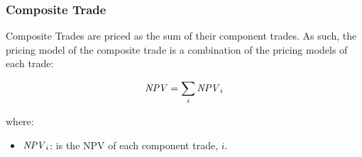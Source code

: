 \subsubsection{Composite Trade}
\label{pricing:composite_trade}

Composite Trades are priced as the sum of their component trades. As such, the pricing model of the composite trade is a combination of the pricing models of each trade:

$$
\mathit{NPV}=\sum_i \mathit{NPV}_i
$$

where:
\begin{itemize}
\item $\mathit{NPV}_i$: is the NPV of each component trade, $i$.
\end{itemize}
